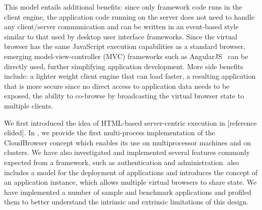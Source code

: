 This model entails additional benefits: since only framework code runs in
the client engine, the application code running on the server does not need
to handle any client/server communication and can be written in an event-based
style similar to that used by desktop user interface frameworks.
Since the virtual browser has the same JavaScript execution capabilities as a
standard browser, emerging model-view-controller (MVC) frameworks such as 
AngularJS~\cite{hevery2009angular} can be directly used, further simplifying application development.
More side benefits include: a lighter weight client engine that can load faster,
a resulting application that is more secure since no direct access to
application data needs to be exposed, the ability to co-browse by broadcasting
the virtual browser state to multiple clients.

We first introduced the idea of HTML-based server-centric execution
in [reference elided].  In \cbtwo, we provide the first
multi-process implementation of the CloudBrowser concept which enables its use on multiprocessor
machines and on clusters. We have also investigated and implemented several features
commonly expected from a framework, such as authentication and administration.
\cbtwo also includes a model for the deployment of applications and introduces the
concept of an application instance, which allows multiple virtual browsers to share
state.  We have implemented a number of sample and benchmark
applications and profiled them to better understand the intrinsic and extrinsic
limitations of this design.

%
%
%
%
%


